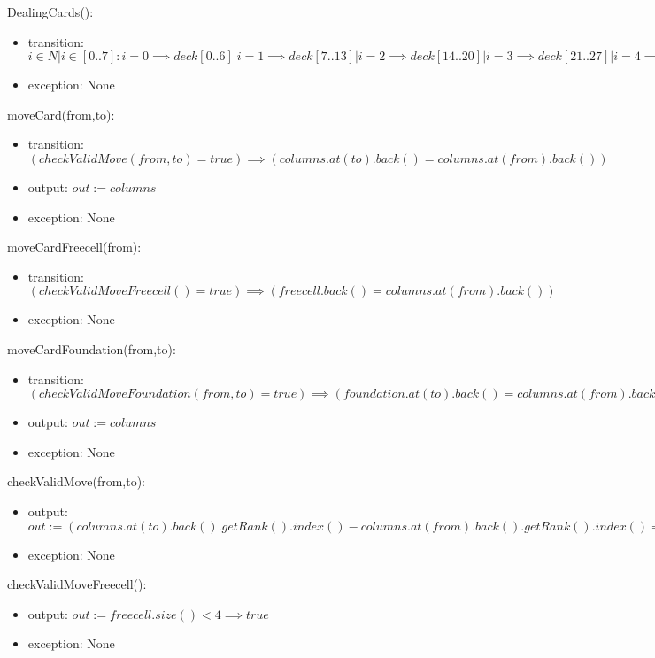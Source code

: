 \documentclass[12pt]{article}
\begin{document}
\noindent DealingCards():
\begin{itemize}
	\item transition: $i\in\mathit{N}|i\in[0..7]:i=0\implies deck[0..6]|i=1\implies deck[7..13]|i=2\implies deck[14..20]|i=3\implies deck[21..27]|i=4\implies deck[28..33]|i=5\implies deck[34..39]|i=6\implies deck[40..45]|i=7\implies deck[46..51]|$
	\item exception: None
\end{itemize}

\noindent moveCard(from,to):
\begin{itemize}
	\item transition: $(checkValidMove(from,to) = true) \implies (columns.at(to).back() = columns.at(from).back())$
	\item output: $out :=columns$
	\item exception: None
\end{itemize}

\noindent moveCardFreecell(from):
\begin{itemize}
	\item transition: $(checkValidMoveFreecell() = true) \implies (freecell.back() = columns.at(from).back())$
	\item exception: None
\end{itemize}

\noindent moveCardFoundation(from,to):
\begin{itemize}
	\item transition: $(checkValidMoveFoundation(from,to) = true) \implies (foundation.at(to).back() = columns.at(from).back())$
	\item output: $out :=columns$
	\item exception: None
\end{itemize}

\noindent checkValidMove(from,to):
\begin{itemize}
	\item output: $out := (columns.at(to).back().getRank().index() - columns.at(from).back().getRank().index() = 1) \land (columns.at(from).back().getColour() != columns.at(to).back().getColour()) \implies true$
	\item exception: None
\end{itemize}

\noindent checkValidMoveFreecell():
\begin{itemize}
	\item output: $out :=freecell.size() < 4 \implies true$
	\item exception: None
\end{itemize}
\end{document}
